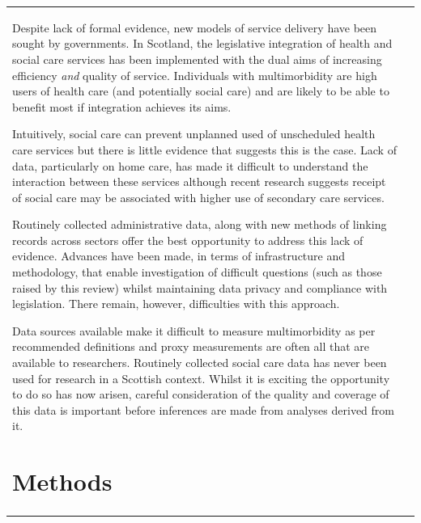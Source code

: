 \documentclass[12pt,a4paper,oneside,table]{report}
\begin{document}
\begin{tabular}[t]{ll}
Despite lack of formal evidence, new models of service delivery have
been sought by governments. In Scotland, the legislative integration of
health and social care services has been implemented with the dual aims
of increasing efficiency \emph{and} quality of service. Individuals with
multimorbidity are high users of health care (and potentially social
care) and are likely to be able to benefit most if integration achieves
its aims.

Intuitively, social care can prevent unplanned used of unscheduled
health care services but there is little evidence that suggests this is
the case. Lack of data, particularly on home care, has made it difficult
to understand the interaction between these services although recent
research suggests receipt of social care may be associated with higher
use of secondary care services.

Routinely collected administrative data, along with new methods of
linking records across sectors offer the best opportunity to address
this lack of evidence. Advances have been made, in terms of
infrastructure and methodology, that enable investigation of difficult
questions (such as those raised by this review) whilst maintaining data
privacy and compliance with legislation. There remain, however,
difficulties with this approach.

Data sources available make it difficult to measure multimorbidity as
per recommended definitions and proxy measurements are often all that
are available to researchers. Routinely collected social care data has
never been used for research in a Scottish context. Whilst it is
exciting the opportunity to do so has now arisen, careful consideration
of the quality and coverage of this data is important before inferences
are made from analyses derived from it.

\FloatBarrier
\newpage

\chapter{Methods}\label{ch:data}
\thispagestyle{empty}


\end{tabular}
\end{document}
